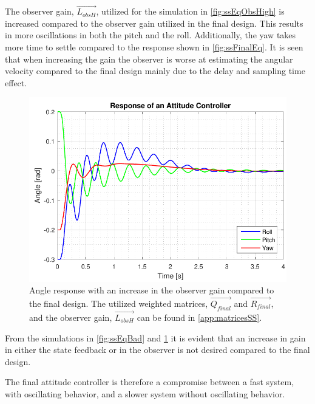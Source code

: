 The observer gain, $\vec{L_{obsH}}$, utilized for the simulation in  \autoref{fig:ssEqObsHigh} is increased compared to the observer gain utilized in the final design. This results in more oscillations in both the pitch and the roll. Additionally, the yaw takes more time to settle compared to the response shown in \autoref{fig:ssFinalEq}. It is seen that when increasing the gain the observer is worse at estimating the angular velocity compared to the final design mainly due to the delay and sampling time effect.
%
\begin{figure}[H]
	\centering
	\includegraphics[scale=0.7]{figures/ssEqObsHigh.pdf}
	\caption{Angle response with an increase in the observer gain compared to the final design. The utilized weighted matrices, $\vec{Q_{final}}$ and $\vec{R_{final}}$, and the observer gain, $\vec{L_{obsH}}$ can be found in \autoref{app:matricesSS}.}
	\label{fig:ssEqObsHigh}
\end{figure}
%
From the simulations in \autoref{fig:ssEqBad} and \ref{fig:ssEqObsHigh} it is evident that an increase in gain in either the state feedback or in the observer is not desired compared to the final design.

The final attitude controller is therefore a compromise between a fast system, with oscillating behavior, and a slower system without oscillating behavior.

